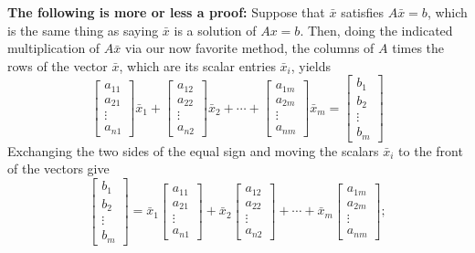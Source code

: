 \vspace{0.5cm}
\begin{tcolorbox}%
\textbf{The following is more or less a proof:} Suppose that $\bar{x}$ satisfies $A \bar{x} =b$, which is the same thing as saying $\bar{x}$ is a solution of $Ax=b$. Then, doing the indicated multiplication of $A \bar{x}$ via our now favorite method, the columns of $A$ times the rows of the vector $\bar{x}$, which are its scalar entries $\bar{x}_i$, yields
\begin{equation}
    \label{eq:bIsLinearCombinationColumnsA02}
\begin{bmatrix} a_{11} \\ a_{21}\\ \vdots \\ a_{n1} \end{bmatrix} \bar{x}_1 +  \begin{bmatrix} a_{12} \\ a_{22}\\ \vdots \\ a_{n2} \end{bmatrix} \bar{x}_2 + \cdots + \begin{bmatrix} a_{1m} \\ a_{2m}\\ \vdots \\ a_{nm} \end{bmatrix} \bar{x}_m = \begin{bmatrix} b_1 \\ b_2\\ \vdots \\ b_m \end{bmatrix}
\end{equation}
Exchanging the two sides of the equal sign and moving the scalars $\bar{x}_i$ to the front of the vectors give
\begin{equation}
    \label{eq:bIsLinearCombinationColumnsAflipped}
 \begin{bmatrix} b_1 \\ b_2\\ \vdots \\ b_m \end{bmatrix} = \bar{x}_1 \begin{bmatrix} a_{11} \\ a_{21}\\ \vdots \\ a_{n1} \end{bmatrix}+ \bar{x}_2 \begin{bmatrix} a_{12} \\ a_{22}\\ \vdots \\ a_{n2} \end{bmatrix} + \cdots + \bar{x}_m \begin{bmatrix} a_{1m} \\ a_{2m}\\ \vdots \\ a_{nm} \end{bmatrix};

\end{equation}
\end{tcolorbox}
